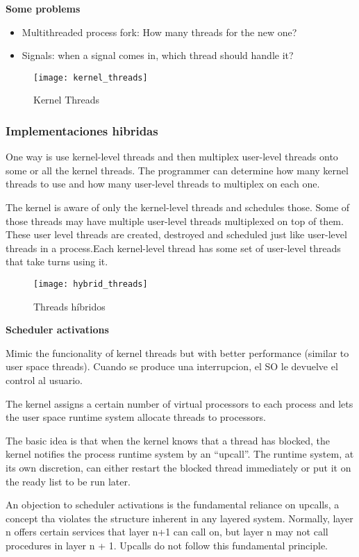\documentclass[a4paper, twoside]{article}
\begin{document}
\textbf{Some problems}
\begin{itemize}
	\item Multithreaded process fork: How many threads for the new one?
	\item Signals: when a signal comes in, which thread should handle it?
\end{itemize}

\begin{figure}[h]
	\centering
	\texttt{[image: kernel\_threads]}
	\caption{Kernel Threads}
	\label{fig:kernel_threads}
\end{figure}

\subsubsection{Implementaciones hibridas}
One way is use kernel-level threads and then multiplex user-level threads onto some or all the kernel threads. The programmer can determine how many kernel threads to use and how many user-level threads to multiplex on each one.

The kernel is aware of only the kernel-level threads and schedules those. Some of those threads may have multiple user-level threads multiplexed on top of them. These user level threads are created, destroyed and scheduled just like user-level threads in a process.Each kernel-level thread has some set of user-level threads that take turns using it.

\begin{figure}[h]
	\centering
	\texttt{[image: hybrid\_threads]}
	\caption{Threads híbridos}
	\label{fig:hybrid_threads}
\end{figure}

\textbf{Scheduler activations}

Mimic the funcionality of kernel threads but with better performance (similar to user space threads).
Cuando se produce una interrupcion, el SO le devuelve el control al usuario.

The kernel assigns a certain number of virtual processors to each process and lets the user space runtime system allocate threads to processors.

The basic idea is that when the kernel knows that a thread has blocked, the kernel notifies the process runtime system by an “upcall”. The runtime system, at its own discretion, can either restart the blocked thread immediately or put it on the ready list to be run later.

An objection to scheduler activations is the fundamental reliance on upcalls, a concept tha violates the structure inherent in any layered system. Normally, layer n offers certain services that layer n+1 can call on, but layer n may not call procedures in layer n + 1. Upcalls do not follow this fundamental principle.
\end{document}
